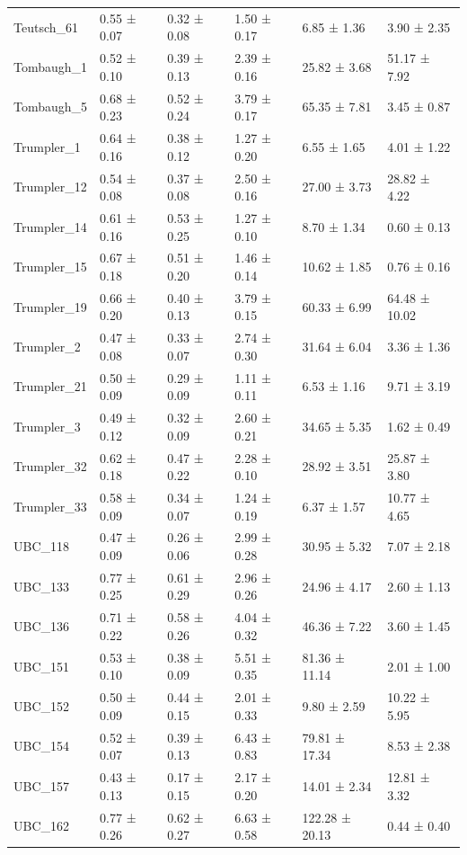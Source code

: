 \begin{tabular}{llllll}
Teutsch_61 & 0.55 ± 0.07 & 0.32 ± 0.08 & 1.50 ± 0.17 & 6.85 ± 1.36 & 3.90 ± 2.35 \\
Tombaugh_1 & 0.52 ± 0.10 & 0.39 ± 0.13 & 2.39 ± 0.16 & 25.82 ± 3.68 & 51.17 ± 7.92 \\
Tombaugh_5 & 0.68 ± 0.23 & 0.52 ± 0.24 & 3.79 ± 0.17 & 65.35 ± 7.81 & 3.45 ± 0.87 \\
Trumpler_1 & 0.64 ± 0.16 & 0.38 ± 0.12 & 1.27 ± 0.20 & 6.55 ± 1.65 & 4.01 ± 1.22 \\
Trumpler_12 & 0.54 ± 0.08 & 0.37 ± 0.08 & 2.50 ± 0.16 & 27.00 ± 3.73 & 28.82 ± 4.22 \\
Trumpler_14 & 0.61 ± 0.16 & 0.53 ± 0.25 & 1.27 ± 0.10 & 8.70 ± 1.34 & 0.60 ± 0.13 \\
Trumpler_15 & 0.67 ± 0.18 & 0.51 ± 0.20 & 1.46 ± 0.14 & 10.62 ± 1.85 & 0.76 ± 0.16 \\
Trumpler_19 & 0.66 ± 0.20 & 0.40 ± 0.13 & 3.79 ± 0.15 & 60.33 ± 6.99 & 64.48 ± 10.02 \\
Trumpler_2 & 0.47 ± 0.08 & 0.33 ± 0.07 & 2.74 ± 0.30 & 31.64 ± 6.04 & 3.36 ± 1.36 \\
Trumpler_21 & 0.50 ± 0.09 & 0.29 ± 0.09 & 1.11 ± 0.11 & 6.53 ± 1.16 & 9.71 ± 3.19 \\
Trumpler_3 & 0.49 ± 0.12 & 0.32 ± 0.09 & 2.60 ± 0.21 & 34.65 ± 5.35 & 1.62 ± 0.49 \\
Trumpler_32 & 0.62 ± 0.18 & 0.47 ± 0.22 & 2.28 ± 0.10 & 28.92 ± 3.51 & 25.87 ± 3.80 \\
Trumpler_33 & 0.58 ± 0.09 & 0.34 ± 0.07 & 1.24 ± 0.19 & 6.37 ± 1.57 & 10.77 ± 4.65 \\
UBC_118 & 0.47 ± 0.09 & 0.26 ± 0.06 & 2.99 ± 0.28 & 30.95 ± 5.32 & 7.07 ± 2.18 \\
UBC_133 & 0.77 ± 0.25 & 0.61 ± 0.29 & 2.96 ± 0.26 & 24.96 ± 4.17 & 2.60 ± 1.13 \\
UBC_136 & 0.71 ± 0.22 & 0.58 ± 0.26 & 4.04 ± 0.32 & 46.36 ± 7.22 & 3.60 ± 1.45 \\
UBC_151 & 0.53 ± 0.10 & 0.38 ± 0.09 & 5.51 ± 0.35 & 81.36 ± 11.14 & 2.01 ± 1.00 \\
UBC_152 & 0.50 ± 0.09 & 0.44 ± 0.15 & 2.01 ± 0.33 & 9.80 ± 2.59 & 10.22 ± 5.95 \\
UBC_154 & 0.52 ± 0.07 & 0.39 ± 0.13 & 6.43 ± 0.83 & 79.81 ± 17.34 & 8.53 ± 2.38 \\
UBC_157 & 0.43 ± 0.13 & 0.17 ± 0.15 & 2.17 ± 0.20 & 14.01 ± 2.34 & 12.81 ± 3.32 \\
UBC_162 & 0.77 ± 0.26 & 0.62 ± 0.27 & 6.63 ± 0.58 & 122.28 ± 20.13 & 0.44 ± 0.40 \\

\end{tabular}
